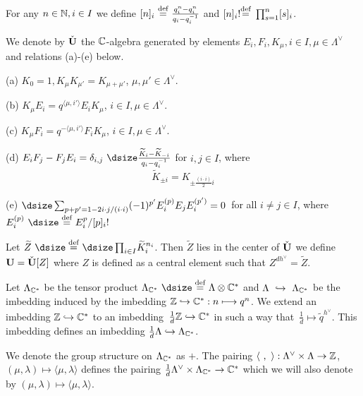 For any $n \in {\Bbb N}, i \in I$  we define $[n]_i\
{\buildrel{\text{def}}\over =}\
{\frac{q^n_i - q^n_i}{q_i-q_i^{-1}}}$  and  $[n]_i! {\buildrel{\text{def}}\over
=}\
\prod^n_{s=1} [s]_i$.

  We  denote by
$\check{\bold U}$  the ${\Bbb C}$-algebra generated by elements $E_i,F_i,
K_\mu,
i \in I, \mu \in \Lambda^\vee$  and relations  (a)-(e) below.

\noindent
(a)  $K_0 = 1, K_\mu K_{\mu'} = K_{\mu + \mu'}$, $\mu,\mu' \in \Lambda^\vee$.

\noindent
(b)  $K_\mu E_i = q^{\langle \mu,i'\rangle} E_iK_\mu$, $i \in I, \mu \in
\Lambda^\vee$.

\noindent
(c)  $K_\mu F_i = q^{- \langle \mu,i'\rangle} F_iK_\mu$, $i \in I, \mu \in
\Lambda^\vee$.

\noindent
(d)  $E_iF_j - F_jE_i = \delta_{i,j}\
{\dsize\frac{\widetilde{K}_i-\widetilde{K}_{-i}}{q_i - q_i^{-1}}}$  for
$i,j \in I$, where
$$
\widetilde{K}_{\pm i} = K_{\pm {\frac{(i\cdot i)}{2}} i}
$$

\noindent
(e)  ${\dsize\sum_{p+p' = 1 - 2i \cdot j/(i \cdot i)}} (-1)^{p'} E_i^{(p)}
E_j E_i^{(p')} = 0$\ for all $i \ne j \in I$,
where $E_i^{(p)}\ {\dsize\buildrel{\text{def}}\over =}\ E^p_i/[p]_i!$

\subheading{2.1.4}  Let  $\widetilde{Z}\ {\dsize\buildrel\text{def}\over  =}\
{\dsize\prod_{i\in I}} \widetilde{K}_i^{n_i}$.  Then $\widetilde{Z}$  lies in
the center
of  $\check{\bold U}$  we define ${\bold U} = \check{\bold U}[Z]$  where  $Z$
is defined as a central
element such that  $Z^{dh^\vee} = \widetilde{Z}$.

  Let $\Lambda_{{\Bbb C}^*}$ be the tensor product
$\Lambda_{{\Bbb C}^*}\ {\dsize\buildrel{\text{def}}\over =}\
\Lambda \otimes {\Bbb C}^*$  and  $\Lambda\ \hookrightarrow\
\Lambda_{{\Bbb C}^*}$  be the imbedding induced by the imbedding ${\Bbb Z}
\hookrightarrow {\Bbb C}^*: n \longmapsto q^n$.   We extend an imbedding
${\Bbb Z} \hookrightarrow {\Bbb C}^*$  to an imbedding\
${\frac{1}{d}} {\Bbb Z} \hookrightarrow {\Bbb C}^*$  in such a way that\
${\frac{1}{d}} \longmapsto \widetilde{q}^{h^\vee}$.  This imbedding defines an
imbedding  ${\frac{1}{d}} \Lambda \hookrightarrow \Lambda_{{\Bbb C}^*}$.

We denote the group structure on $\Lambda_{{\Bbb C}^*}$
as  $+$.  The pairing $\langle\ ,\ \rangle: \Lambda^\vee \times \Lambda \to
{\Bbb Z}$,  $(\mu, \lambda) \longmapsto \langle \mu,\lambda\rangle$  defines
the pairing
${\frac{1}{d}} \Lambda^\vee \times \Lambda_{{\Bbb C}^*} \to {\Bbb C}^*$  which
we will also
denote by  $(\mu, \lambda) \longmapsto \langle \mu,\lambda\rangle$.


